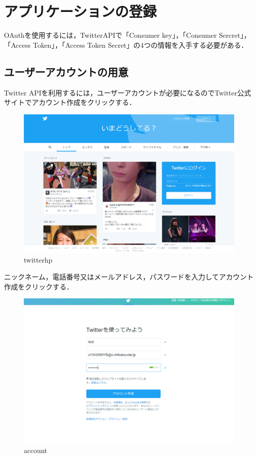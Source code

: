 \clearpage

\section{アプリケーションの登録}
OAuthを使用するには，TwitterAPIで「Consumer key」，「Consumer Sercret」，「Access Token」，「Access Token Secret」の4つの情報を入手する必要がある．

\subsection{ユーザーアカウントの用意}
Twitter APIを利用するには，ユーザーアカウントが必要になるのでTwitter公式サイトでアカウント作成をクリックする．
\begin{figure}[htb]
\centering
\includegraphics[width=15cm]{twitterhp.png}
\caption{twitterhp}\label{twitterhp}
\end{figure}
\clearpage
ニックネーム，電話番号又はメールアドレス，パスワードを入力してアカウント作成をクリックする．
\begin{figure}[htb]
\centering
\includegraphics[width=15cm]{account.png}
\caption{account}\label{account}
\end{figure}
\clearpage
